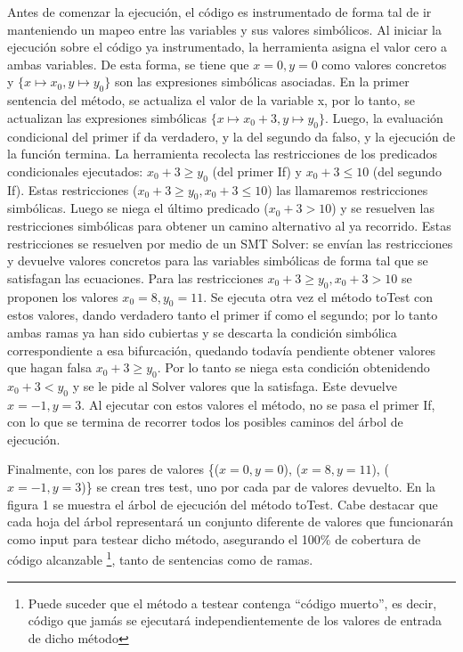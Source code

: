 \documentclass{llncs}
\begin{document}
Antes de comenzar la ejecución, el código es instrumentado de forma tal de ir manteniendo un mapeo entre las variables y sus valores simbólicos. Al iniciar la ejecución sobre el
código ya instrumentado, la herramienta asigna el valor cero a ambas variables. De esta forma, se tiene que $x=0, y=0$ como valores concretos y \(\{x\mapsto x_0,y\mapsto y_0\}\)
son las expresiones simbólicas asociadas. En la primer sentencia del método, se actualiza el valor de la variable x, por lo tanto, se actualizan las expresiones simbólicas
\(\{x\mapsto x_0+3,y\mapsto y_0\}\). Luego, la evaluación condicional del primer if da verdadero, y la del segundo da falso, y la ejecución de la función termina.
La herramienta recolecta las restricciones de los predicados condicionales ejecutados: $x_0+3 \geq y_0$ (del primer If) y $x_0+3 \leq 10$ (del segundo If).
Estas restricciones ($x_0+3 \geq y_0, x_0+3 \leq 10$) las llamaremos restricciones simbólicas. Luego se niega el último predicado ($x_0+3 > 10$) y se resuelven las restricciones
simbólicas para obtener un camino alternativo al ya recorrido. Estas restricciones se resuelven por medio de un SMT Solver: se envían las restricciones y devuelve valores
concretos para las variables simbólicas de forma tal que se satisfagan las ecuaciones. Para las restricciones $x_0+3 \geq y_0, x_0+3 > 10$ se proponen los valores $x_0 = 8, y_0 = 11$.
Se ejecuta otra vez el método toTest con estos valores, dando verdadero tanto el primer if como el segundo; por lo tanto ambas ramas ya han sido cubiertas y se descarta la condición
simbólica correspondiente a esa bifurcación, quedando todavía pendiente obtener valores que hagan falsa $x_0+3 \geq y_0$. Por lo tanto se niega esta condición obtenidendo
$x_0+3 < y_0$ y se le pide al Solver valores que la satisfaga. Este devuelve $x=-1, y=3$. Al ejecutar con estos valores el método, no se pasa el primer If, con lo que se termina de recorrer todos los posibles caminos del árbol de ejecución.

Finalmente, con los pares de valores \{($x=0,y=0$), ($x=8,y=11$), ($x=-1,y=3$)\} se crean tres test, uno por cada par de valores devuelto. En la figura 1 se muestra el árbol
de ejecución del método toTest. Cabe destacar que cada hoja del árbol representará un conjunto diferente de valores que funcionarán como input para testear dicho método,
asegurando el 100\% de cobertura de código alcanzable \footnote{Puede suceder que el método a testear contenga “código muerto”, es decir, código que jamás se ejecutará
independientemente de los valores de entrada de dicho método}, tanto de sentencias como de ramas. 
\end{document}
